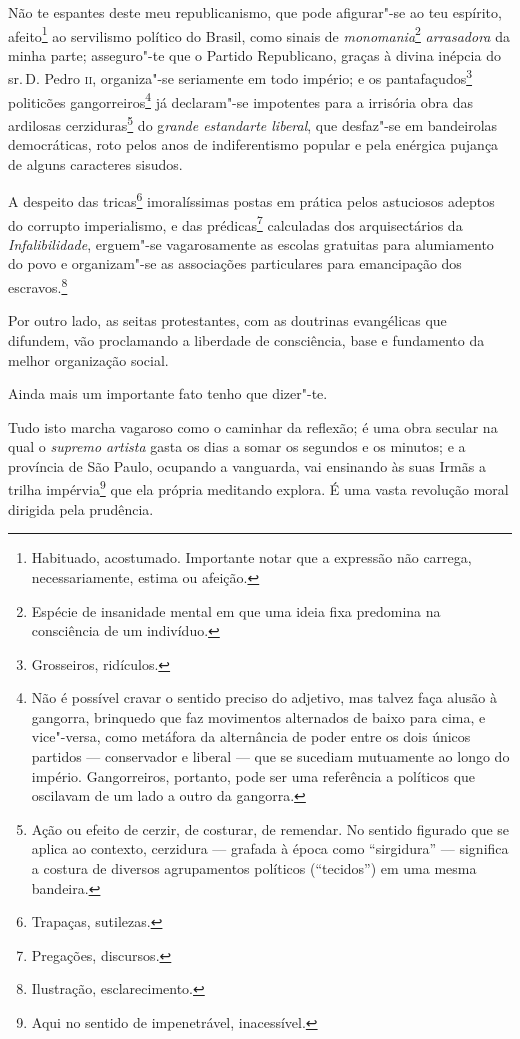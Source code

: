 Não te espantes deste meu republicanismo, que pode afigurar"-se ao teu
espírito, afeito\footnote{Habituado, acostumado. Importante notar que
  a expressão não carrega, necessariamente, estima ou afeição.} ao
servilismo político do Brasil, como sinais de \emph{monomania}\footnote{
  Espécie de insanidade mental em que uma ideia fixa predomina na
  consciência de um indivíduo.} \emph{arrasadora} da minha parte;
asseguro"-te que o Partido Republicano, graças à divina inépcia do sr.\,D.
Pedro \textsc{ii}, organiza"-se seriamente em todo império; e os
pantafaçudos\footnote{Grosseiros, ridículos.} politicões
gangorreiros\footnote{Não é possível cravar o sentido preciso do
  adjetivo, mas talvez faça alusão à gangorra, brinquedo que faz
  movimentos alternados de baixo para cima, e vice"-versa, como metáfora
  da alternância de poder entre os dois únicos partidos --- conservador
  e liberal --- que se sucediam mutuamente ao longo do império.
  Gangorreiros, portanto, pode ser uma referência a políticos que
  oscilavam de um lado a outro da gangorra.} já declaram"-se impotentes
para a irrisória obra das ardilosas cerziduras\footnote{Ação ou efeito
  de cerzir, de costurar, de remendar. No sentido figurado que se aplica
  ao contexto, cerzidura --- grafada à época como ``sirgidura'' ---
  significa a costura de diversos agrupamentos políticos (``tecidos'') em
  uma mesma bandeira.} do g\emph{rande estandarte liberal}, que
desfaz"-se em bandeirolas democráticas, roto pelos anos de indiferentismo
popular e pela enérgica pujança de alguns caracteres sisudos.

A despeito das tricas\footnote{Trapaças, sutilezas.} imoralíssimas
postas em prática pelos astuciosos adeptos do corrupto imperialismo, e
das prédicas\footnote{Pregações, discursos.} calculadas dos
arquisectários da \emph{Infalibilidade}, erguem"-se vagarosamente as
escolas gratuitas para alumiamento do povo e organizam"-se as associações
particulares para emancipação dos escravos.\footnote{Ilustração,
  esclarecimento.}

Por outro lado, as seitas protestantes, com as doutrinas evangélicas que
difundem, vão proclamando a liberdade de consciência, base e fundamento
da melhor organização social.

Ainda mais um importante fato tenho que dizer"-te.

Tudo isto marcha vagaroso como o caminhar da reflexão; é uma obra
secular na qual o \emph{supremo artista} gasta os dias a somar os
segundos e os minutos; e a província de São Paulo, ocupando a vanguarda,
vai ensinando às suas Irmãs a trilha impérvia\footnote{Aqui no sentido
  de impenetrável, inacessível.} que ela própria meditando explora. É
uma vasta revolução moral dirigida pela prudência.

